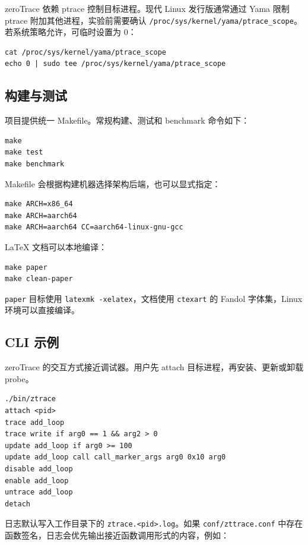 \documentclass[UTF8,a4paper,11pt,fontset=fandol]{ctexart}
\newcommand{\code}[1]{\texttt{#1}}
\begin{document}
zeroTrace 依赖 ptrace 控制目标进程。现代 Linux 发行版通常通过 Yama 限制 ptrace 附加其他进程，实验前需要确认 \code{/proc/sys/kernel/yama/ptrace\_scope}。若系统策略允许，可临时设置为 0：

\begin{lstlisting}
cat /proc/sys/kernel/yama/ptrace_scope
echo 0 | sudo tee /proc/sys/kernel/yama/ptrace_scope
\end{lstlisting}

\subsection{构建与测试}

项目提供统一 Makefile。常规构建、测试和 benchmark 命令如下：

\begin{lstlisting}
make
make test
make benchmark
\end{lstlisting}

Makefile 会根据构建机器选择架构后端，也可以显式指定：

\begin{lstlisting}
make ARCH=x86_64
make ARCH=aarch64
make ARCH=aarch64 CC=aarch64-linux-gnu-gcc
\end{lstlisting}

LaTeX 文档可以本地编译：

\begin{lstlisting}
make paper
make clean-paper
\end{lstlisting}

\code{paper} 目标使用 \code{latexmk -xelatex}，文档使用 \code{ctexart} 的 Fandol 字体集，Linux 环境可以直接编译。

\subsection{CLI 示例}

zeroTrace 的交互方式接近调试器。用户先 attach 目标进程，再安装、更新或卸载 probe。

\begin{lstlisting}
./bin/ztrace
attach <pid>
trace add_loop
trace write if arg0 == 1 && arg2 > 0
update add_loop if arg0 >= 100
update add_loop call call_marker_args arg0 0x10 arg0
disable add_loop
enable add_loop
untrace add_loop
detach
\end{lstlisting}

日志默认写入工作目录下的 \code{ztrace.<pid>.log}。如果 \code{conf/zttrace.conf} 中存在函数签名，日志会优先输出接近函数调用形式的内容，例如：
\end{document}
